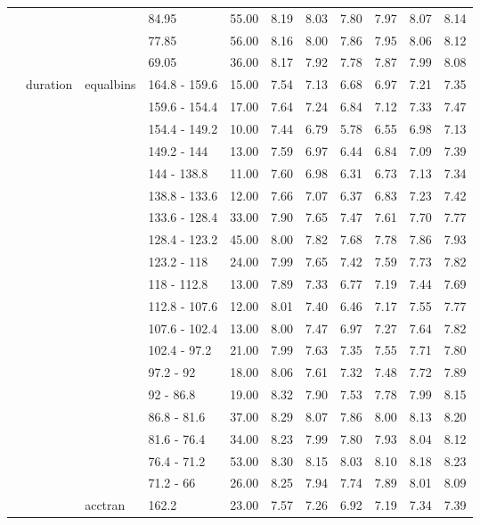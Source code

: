 \begin{longtable}{llllrrrrrrr}
   &  &  & 84.95 & 55.00 & 8.19 & 8.03 & 7.80 & 7.97 & 8.07 & 8.14 \\ 
   &  &  & 77.85 & 56.00 & 8.16 & 8.00 & 7.86 & 7.95 & 8.06 & 8.12 \\ 
   &  &  & 69.05 & 36.00 & 8.17 & 7.92 & 7.78 & 7.87 & 7.99 & 8.08 \\ 
   & duration & equalbins & 164.8 - 159.6 & 15.00 & 7.54 & 7.13 & 6.68 & 6.97 & 7.21 & 7.35 \\ 
   &  &  & 159.6 - 154.4 & 17.00 & 7.64 & 7.24 & 6.84 & 7.12 & 7.33 & 7.47 \\ 
   &  &  & 154.4 - 149.2 & 10.00 & 7.44 & 6.79 & 5.78 & 6.55 & 6.98 & 7.13 \\ 
   &  &  & 149.2 - 144 & 13.00 & 7.59 & 6.97 & 6.44 & 6.84 & 7.09 & 7.39 \\ 
   &  &  & 144 - 138.8 & 11.00 & 7.60 & 6.98 & 6.31 & 6.73 & 7.13 & 7.34 \\ 
   &  &  & 138.8 - 133.6 & 12.00 & 7.66 & 7.07 & 6.37 & 6.83 & 7.23 & 7.42 \\ 
   &  &  & 133.6 - 128.4 & 33.00 & 7.90 & 7.65 & 7.47 & 7.61 & 7.70 & 7.77 \\ 
   &  &  & 128.4 - 123.2 & 45.00 & 8.00 & 7.82 & 7.68 & 7.78 & 7.86 & 7.93 \\ 
   &  &  & 123.2 - 118 & 24.00 & 7.99 & 7.65 & 7.42 & 7.59 & 7.73 & 7.82 \\ 
   &  &  & 118 - 112.8 & 13.00 & 7.89 & 7.33 & 6.77 & 7.19 & 7.44 & 7.69 \\ 
   &  &  & 112.8 - 107.6 & 12.00 & 8.01 & 7.40 & 6.46 & 7.17 & 7.55 & 7.77 \\ 
   &  &  & 107.6 - 102.4 & 13.00 & 8.00 & 7.47 & 6.97 & 7.27 & 7.64 & 7.82 \\ 
   &  &  & 102.4 - 97.2 & 21.00 & 7.99 & 7.63 & 7.35 & 7.55 & 7.71 & 7.80 \\ 
   &  &  & 97.2 - 92 & 18.00 & 8.06 & 7.61 & 7.32 & 7.48 & 7.72 & 7.89 \\ 
   &  &  & 92 - 86.8 & 19.00 & 8.32 & 7.90 & 7.53 & 7.78 & 7.99 & 8.15 \\ 
   &  &  & 86.8 - 81.6 & 37.00 & 8.29 & 8.07 & 7.86 & 8.00 & 8.13 & 8.20 \\ 
   &  &  & 81.6 - 76.4 & 34.00 & 8.23 & 7.99 & 7.80 & 7.93 & 8.04 & 8.12 \\ 
   &  &  & 76.4 - 71.2 & 53.00 & 8.30 & 8.15 & 8.03 & 8.10 & 8.18 & 8.23 \\ 
   &  &  & 71.2 - 66 & 26.00 & 8.25 & 7.94 & 7.74 & 7.89 & 8.01 & 8.09 \\ 
   &  & acctran & 162.2 & 23.00 & 7.57 & 7.26 & 6.92 & 7.19 & 7.34 & 7.39 \\ 

\end{longtable}
